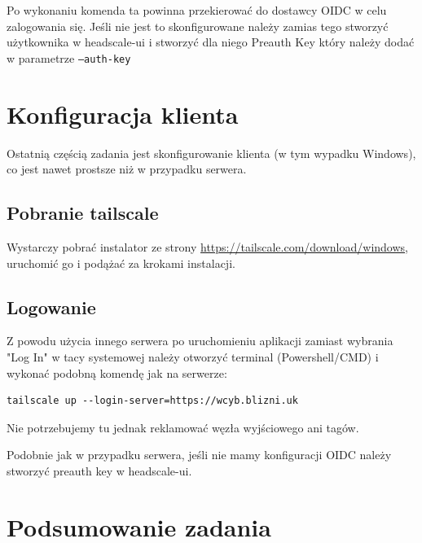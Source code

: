 \documentclass{report}
\numberwithin{equation}{section}
\begin{document}
Po wykonaniu komenda ta powinna przekierować do dostawcy OIDC w celu zalogowania się. Jeśli nie jest to skonfigurowane należy zamias tego stworzyć użytkownika w headscale-ui i stworzyć dla niego Preauth Key który należy dodać w parametrze \texttt{--auth-key}

\section{Konfiguracja klienta}
Ostatnią częścią zadania jest skonfigurowanie klienta (w tym wypadku Windows), co jest nawet prostsze niż w przypadku serwera.
\subsection{Pobranie tailscale}
Wystarczy pobrać instalator ze strony \url{https://tailscale.com/download/windows}, uruchomić go i podążać za krokami instalacji.
\subsection{Logowanie}
Z powodu użycia innego serwera po uruchomieniu aplikacji zamiast wybrania "Log In" w tacy systemowej należy otworzyć terminal (Powershell/CMD) i wykonać podobną komendę jak na serwerze:
\begin{verbatim}
tailscale up --login-server=https://wcyb.blizni.uk
\end{verbatim}
Nie potrzebujemy tu jednak reklamować węzła wyjściowego ani tagów.

Podobnie jak w przypadku serwera, jeśli nie mamy konfiguracji OIDC należy stworzyć preauth key w headscale-ui.
\section{Podsumowanie zadania}
\end{document}
